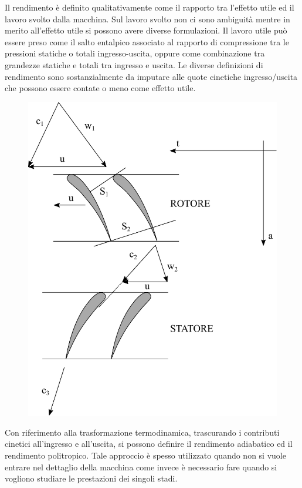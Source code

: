 Il rendimento è definito qualitativamente come il rapporto tra l'effetto utile ed il lavoro svolto dalla macchina. Sul lavoro svolto non ci sono ambiguità mentre in merito all'effetto utile si possono avere diverse formulazioni. Il lavoro utile può essere preso come il salto entalpico associato al rapporto di compressione tra le pressioni statiche o totali ingresso-uscita, oppure come combinazione tra grandezze statiche e totali tra ingresso e uscita. Le diverse definizioni di rendimento sono sostanzialmente da imputare alle quote cinetiche ingresso/uscita che possono essere contate o meno come effetto utile.
\begin{figure}
\centering
  \includegraphics[width=.5\textwidth]{fig/schieraTComp.pdf}
\caption{}
\label{fig:schieraTComp}
\end{figure}
Con riferimento alla trasformazione termodinamica, trascurando i contributi cinetici all'ingresso e all'uscita, si possono definire il rendimento adiabatico ed il rendimento politropico. Tale approccio è spesso utilizzato quando non si vuole entrare nel dettaglio della macchina come invece è necessario fare quando si vogliono studiare le prestazioni dei singoli stadi. 

